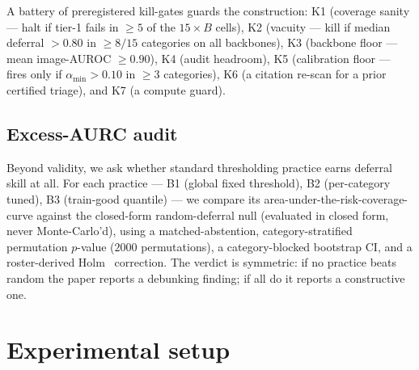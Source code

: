 \documentclass[11pt]{article}
\begin{document}
A battery of preregistered kill-gates guards the construction: K1 (coverage sanity --- halt if
tier-1 fails in $\ge 5$ of the $15\!\times\!B$ cells), K2 (vacuity --- kill if median deferral
$>0.80$ in $\ge 8/15$ categories on all backbones), K3 (backbone floor --- mean image-AUROC
$\ge 0.90$), K4 (audit headroom), K5 (calibration floor --- fires only if $\alpha_{\min}>0.10$ in
$\ge 3$ categories), K6 (a citation re-scan for a prior certified triage), and K7 (a compute guard).

\subsection{Excess-AURC audit}
\label{sec:audit}

Beyond validity, we ask whether standard thresholding practice earns deferral skill at all.
For each practice --- B1 (global fixed threshold), B2 (per-category tuned), B3 (train-good quantile)
--- we compare its area-under-the-risk-coverage-curve against the closed-form random-deferral null
(evaluated in closed form, never Monte-Carlo'd), using a matched-abstention,
category-stratified permutation $p$-value ($2000$ permutations), a category-blocked bootstrap CI,
and a roster-derived Holm~\citep{holm1979simple} correction. The verdict is symmetric: if no
practice beats random the paper reports a debunking finding; if all do it reports a constructive one.

\section{Experimental setup}
\label{sec:setup}
\end{document}
